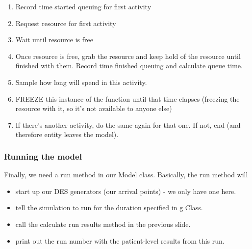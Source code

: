 \documentclass[
  letterpaper,
  DIV=11,
  numbers=noendperiod]{scrreprt}
\providecommand{\tightlist}{%
  \setlength{\itemsep}{0pt}\setlength{\parskip}{0pt}}\usepackage{longtable,booktabs,array}
\begin{document}
\begin{enumerate}
\def\labelenumi{\arabic{enumi}.}
\tightlist
\item
  Record time started queuing for first activity
\item
  Request resource for first activity
\item
  Wait until resource is free
\item
  Once resource is free, grab the resource and keep hold of the resource
  until finished with them. Record time finished queuing and calculate
  queue time.
\item
  Sample how long will spend in this activity.
\item
  FREEZE this instance of the function until that time elapses (freezing
  the resource with it, so it's not available to anyone else)
\item
  If there's another activity, do the same again for that one. If not,
  end (and therefore entity leaves the model).
\end{enumerate}

\subsubsection{Running the model}\label{running-the-model}

Finally, we need a run method in our Model class. Basically, the run
method will

\begin{itemize}
\tightlist
\item
  start up our DES generators (our arrival points) - we only have one
  here.
\item
  tell the simulation to run for the duration specified in g Class.
\item
  call the calculate run results method in the previous slide.
\item
  print out the run number with the patient-level results from this run.
\end{itemize}
\end{document}

